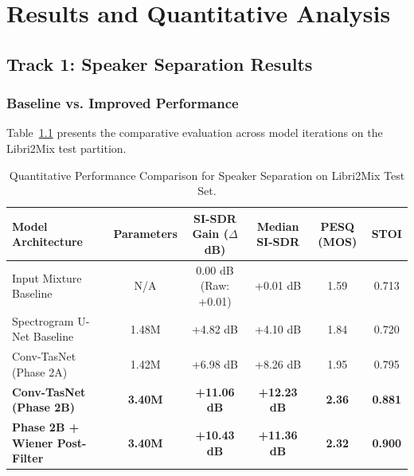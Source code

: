 \documentclass[11pt,a4paper]{report}
\begin{document}
\chapter{Results and Quantitative Analysis}
\label{chap:results}

\section{Track 1: Speaker Separation Results}
\subsection{Baseline vs. Improved Performance}
Table~\ref{tab:separation_comparison} presents the comparative evaluation across model iterations on the Libri2Mix test partition.

\begin{table}[H]
\centering
\caption{Quantitative Performance Comparison for Speaker Separation on Libri2Mix Test Set.}
\label{tab:separation_comparison}
\small
\begin{tabularx}{\textwidth}{lccccc}
\toprule
\textbf{Model Architecture} & \textbf{Parameters} & \textbf{SI-SDR Gain ($\Delta$dB)} & \textbf{Median SI-SDR} & \textbf{PESQ (MOS)} & \textbf{STOI} \\
\midrule
Input Mixture Baseline      & N/A                 & 0.00 dB (Raw: +0.01)               & +0.01 dB               & 1.59                & 0.713 \\
Spectrogram U-Net Baseline  & 1.48M               & +4.82 dB                           & +4.10 dB               & 1.84                & 0.720 \\
Conv-TasNet (Phase 2A)      & 1.42M               & +6.98 dB                           & +8.26 dB               & 1.95                & 0.795 \\
\textbf{Conv-TasNet (Phase 2B)} & \textbf{3.40M}  & \textbf{+11.06 dB}                 & \textbf{+12.23 dB}     & \textbf{2.36}       & \textbf{0.881} \\
\textbf{Phase 2B + Wiener Post-Filter} & \textbf{3.40M} & \textbf{+10.43 dB}          & \textbf{+11.36 dB}     & \textbf{2.32}       & \textbf{0.900} \\
\bottomrule
\end{tabularx}
\end{table}
\end{document}
